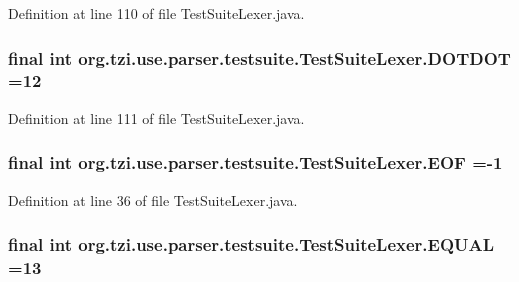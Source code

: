 Definition at line 110 of file Test\-Suite\-Lexer.\-java.

\hypertarget{classorg_1_1tzi_1_1use_1_1parser_1_1testsuite_1_1_test_suite_lexer_a7ff5bb63abcd0b669e790a808ca4b4e7}{
\subsubsection[{D\-O\-T\-D\-O\-T}]{\setlength{\rightskip}{0pt plus 5cm}final int org.\-tzi.\-use.\-parser.\-testsuite.\-Test\-Suite\-Lexer.\-D\-O\-T\-D\-O\-T =12\hspace{0.3cm}{\ttfamily [static]}}}\label{classorg_1_1tzi_1_1use_1_1parser_1_1testsuite_1_1_test_suite_lexer_a7ff5bb63abcd0b669e790a808ca4b4e7}


Definition at line 111 of file Test\-Suite\-Lexer.\-java.

\hypertarget{classorg_1_1tzi_1_1use_1_1parser_1_1testsuite_1_1_test_suite_lexer_aa4a525086832e7afe7a75b5c122c009a}{
\subsubsection[{E\-O\-F}]{\setlength{\rightskip}{0pt plus 5cm}final int org.\-tzi.\-use.\-parser.\-testsuite.\-Test\-Suite\-Lexer.\-E\-O\-F =-\/1\hspace{0.3cm}{\ttfamily [static]}}}\label{classorg_1_1tzi_1_1use_1_1parser_1_1testsuite_1_1_test_suite_lexer_aa4a525086832e7afe7a75b5c122c009a}


Definition at line 36 of file Test\-Suite\-Lexer.\-java.

\hypertarget{classorg_1_1tzi_1_1use_1_1parser_1_1testsuite_1_1_test_suite_lexer_afd9edbc74a323044a1c32e19a044231a}{
\subsubsection[{E\-Q\-U\-A\-L}]{\setlength{\rightskip}{0pt plus 5cm}final int org.\-tzi.\-use.\-parser.\-testsuite.\-Test\-Suite\-Lexer.\-E\-Q\-U\-A\-L =13\hspace{0.3cm}{\ttfamily [static]}}}\label{classorg_1_1tzi_1_1use_1_1parser_1_1testsuite_1_1_test_suite_lexer_afd9edbc74a323044a1c32e19a044231a}



